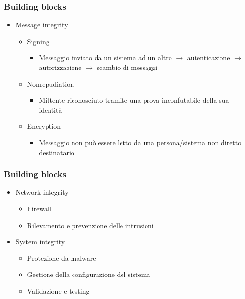 \begin{frame}
  \frametitle{Building blocks}
  \begin{itemize}[<+- | alert@+>]
  \item Message integrity
  \begin{itemize}
  \item Signing
  	\begin{itemize}
  	\item Messaggio inviato da un sistema ad un altro $\rightarrow$ autenticazione $\rightarrow$ autorizzazione $\rightarrow$ scambio di messaggi
  	\end{itemize}
  \item Nonrepudiation
    \begin{itemize}
  	\item Mittente riconosciuto tramite una prova inconfutabile della sua identità
  	\end{itemize}
  \item Encryption
    \begin{itemize}
  	\item Messaggio non può essere letto da una persona/sistema non diretto destinatario
  	\end{itemize}
 	\end{itemize}
  \end{itemize}
\end{frame}

\begin{frame}
  \frametitle{Building blocks}
  \begin{itemize}[<+- | alert@+>]
  \item Network integrity
  \begin{itemize}
  \item Firewall
  \item Rilevamento e prevenzione delle intrusioni
 	\end{itemize}
   \item System integrity
     \begin{itemize}
  \item Protezione da malware
  \item Gestione della configurazione del sistema
  \item Validazione e testing
 	\end{itemize}
  \end{itemize}
\end{frame}


